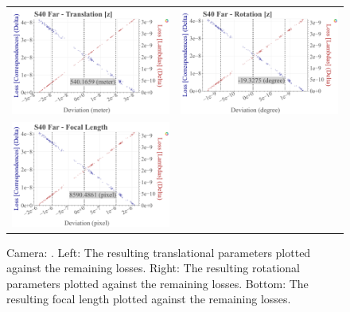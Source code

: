 \begin{figure}[!ht]
\begin{tabular}{cc}
    \includegraphics[width=0.45 \linewidth]{diagrams/calibration/s40_n_far/parameters.csv/Translation[z]_vs_Loss[Correspondences]_vs_Loss[Lambdas]_cluster_All.png} &
    \includegraphics[width=0.45 \linewidth]{diagrams/calibration/s40_n_far/parameters.csv/Rotation[z]_vs_Loss[Correspondences]_vs_Loss[Lambdas]_cluster_All.png} \\

    \includegraphics[width=0.45 \linewidth]{diagrams/calibration/s40_n_far/parameters.csv/FocalLength_vs_Loss[Correspondences]_vs_Loss[Lambdas]_cluster_All.png} &
\end{tabular}
\caption{
  Camera: .
  Left: The resulting translational parameters plotted against the remaining losses. 
  Right: The resulting rotational parameters plotted against the remaining losses.
  Bottom: The resulting focal length  plotted against the remaining losses.
   }
\label{fig:static_calibration_algorithmic_error_s40_n_far}
\end{figure}

